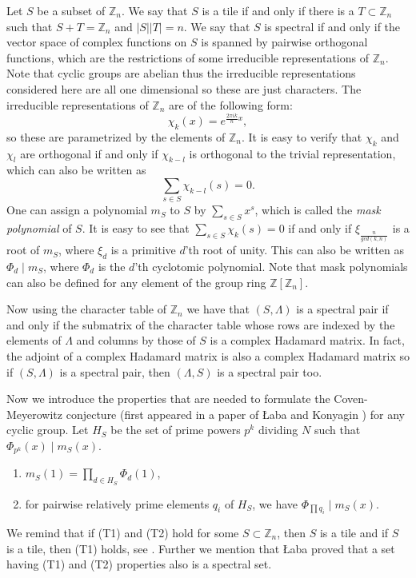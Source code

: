\documentclass[10pt]{article}
\newcommand{\Z}{\mathbb{Z}}
\newcommand{\La}{\Lambda}
\begin{document}
        Let $S $ be a subset of $\Z_n$. We say that $S$ is a tile if and only if there is a $T \subset \Z_n$ such that $S+T=\Z_n$ and $|S||T|=n$. 
        We say that $S$ is spectral if and only if the vector space of complex functions on $S$ is spanned by pairwise orthogonal functions, which are the restrictions of some irreducible representations of $\Z_n$. Note that cyclic groups are abelian thus the irreducible representations considered here are all one dimensional so these are just characters. The irreducible representations of $\Z_n$ are of the following form: 
        \[ \chi_k(x)=e^{\frac{2 \pi i k}{n}x},\]
        so these are parametrized by the elements of $\Z_n$. It is easy to verify that $\chi_k$ and $\chi_l$ are orthogonal if and only if $\chi_{k-l}$ is orthogonal to the trivial representation, which can also be written as 
        \[ \sum_{s\in S} \chi_{k-l}(s)=0.
        \]
        One can assign a polynomial $m_S$ to $S$ by $\sum_{s \in S}x^s$, which is called the {\it mask polynomial} of $S$. It is easy to see that $\sum_{s\in S} \chi_{k}(s)=0$ if and only if $\xi_{\frac{n}{gcd(k,n)}}$ is a root of $m_S$, where $\xi_d$ is a primitive $d$'th root of unity. This can also be written as $\Phi_d \mid m_S$, where $\Phi_d$ is the $d$'th cyclotomic polynomial. 
        Note that mask polynomials can also be defined for any element of the group ring $\Z[\Z_n]$.
        
        Now using the character table of $\Z_n$ we have that $(S,\La)$ is a spectral pair if and only if the submatrix of the character table whose rows are indexed by the elements of $\La$ and columns by those of $S$ is a complex Hadamard matrix. In fact, the adjoint of a complex Hadamard matrix is also a complex Hadamard matrix so if $(S,\La)$ is a spectral pair, then $(\La,S)$ is a spectral pair too. 
        
        Now we introduce the properties that are needed to formulate the Coven-Meyerowitz conjecture (first appeared in a paper of \L aba and Konyagin \cite{labakonyagin}) for any cyclic group. Let $H_S$ be the
        set of prime powers $p^k$ dividing $N$ such that $\Phi_{p^k}(x) \mid
        m_S(x)$.
        \begin{enumerate}[{\bf(T1)}]
             \item\label{t1} $m_S(1)=\prod_{d \in H_S} \Phi_d(1)$,
         \item\label{t2} for pairwise relatively prime elements $q_i$ of $H_S$, we have $\Phi_{\prod q_i} \mid m_S(x)$.
        \end{enumerate}
        We remind that if (T1) and (T2) hold for some $S \subset \Z_n$, then $S$ is a tile and if $S$ is a tile, then (T1) holds, see \cite{cm}. Further we mention that \L aba \cite{laba} proved that a set having (T1) and (T2) properties also is a spectral set.
\end{document}
